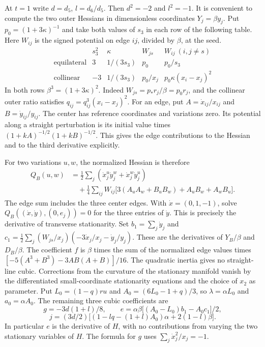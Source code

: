 \documentclass[11pt,letterpaper]{article}
\theoremstyle{definition}
\begin{document}
At $t=1$ write $d=d_5$, $l=d_6/d_5$. Then $d^2=-2$ and $l^2=-1$.
It is convenient to compute the two outer Hessians in dimensionless
coordinates $Y_j=\beta y_j$. Put $p_0=(1+3\kappa)^{-1}$ and take both
values of $s_3$ in each row of the following table. Here $W_{ij}$ is
the signed potential on edge $ij$, divided by $\beta$, at the seed.
\[
\begin{array}{c|cccc}
 &s_3^2& \kappa& W_{js}&W_{ij}\ (i,j\ne s) \\ \hline
\text{equilateral} &3&1/(3s_3)&p_0&p_0/s_3\\
\text{collinear} &-3&1/(3s_3)&p_0/x_j&p_0\kappa(x_i-x_j)^2
\end{array}
\]
In both rows $\beta^3=(1+3\kappa)^2$.
Indeed $W_{js}=p_*r_j/\beta=p_0r_j$, and the collinear outer ratio
satisfies $q_{ij}=q_{ij}^3(x_i-x_j)^2$.
For an edge, put $A=\dot x_{ij}/x_{ij}$ and $B=\dot y_{ij}/y_{ij}$. The center has reference coordinates and variations zero. Its potential along a straight perturbation is its initial value times $(1+k A)^{-1/2}(1+k B)^{-1/2}$. This gives the edge contributions to the Hessian and to the third derivative explicitly.

For two variations $u,w$, the normalized Hessian is therefore
\begin{align*}
 Q_B(u,w)&=\frac12\sum_j(\dot x_j^u\dot y_j^w+\dot x_j^w\dot y_j^u)\\
 &\quad +\frac14\sum_{ij}W_{ij}\big[3(A_uA_w+B_uB_w)+A_uB_w+A_wB_u\big].
\end{align*}
The edge sum includes the three center edges. With $\dot x=(0,1,-1)$,
solve $Q_B((\dot x,\dot y),(0,e_j))=0$ for the three entries of $\dot y$.
This is precisely the derivative of transverse stationarity.
Set $b_1=\sum_j\dot y_j$ and
$c_1=\tfrac12\sum_j(W_{js}/x_j)(-3\dot x_j/x_j-\dot y_j/y_j)$.
These are the derivatives of $Y_B/\beta$ and $D_B/\beta$.
The coefficient $f$ is $\beta$ times the sum of the normalized edge values times $[-5(A^3+B^3)-3AB(A+B)]/16$. The quadratic inertia gives no straight-line cubic. Corrections from the curvature of the stationary manifold vanish by the differentiated small-coordinate stationarity equations and the choice of $x_2$ as parameter. Put $L_0=(1-q)r u$ and $A_0=(6L_0-1+q)/3$, so $\lambda=\alpha L_0$ and $a_0=\alpha A_0$. The remaining three cubic coefficients are
\[
g=-3d(1+l)/8,\qquad
e=\alpha\beta\big[(A_0-L_0)b_1-A_0c_1\big]/2,
\]
\[
j=(3d/2)\big[(1-lq-(1+l)A_0)\alpha+2(1-l)\beta\big].
\]
In particular $e$ is the derivative of $H$, with no contributions from varying the two stationary variables of $H$. The formula for $g$ uses $\sum_j\dot x_j^2/x_j=-1$.
\end{document}
